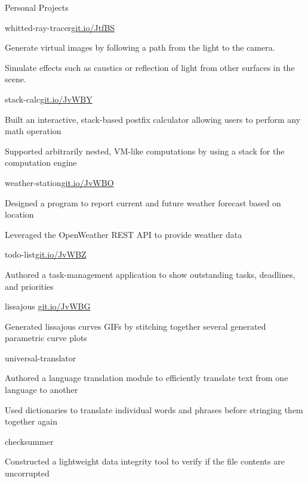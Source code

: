 \documentclass{resume} %
\begin{document}
\begin{rSection}{Personal Projects}
  \begin{rSubsection}{whitted-ray-tracer}{\href{https://git.io/JtfBS}{git.io/JtfBS}}{}{}
    \item Generate virtual images by following a path from the light to the camera.
    \item Simulate effects such as caustics or reflection of light from other surfaces in the scene.
  \end{rSubsection}

  \begin{rSubsection}{stack-calc}{\href{https://git.io/JvWBY}{git.io/JvWBY}}{}{}
    \item Built an interactive, stack-based postfix calculator allowing users
      to perform any math operation
    \item Supported arbitrarily nested, VM-like computations by using a stack
      for the computation engine
  \end{rSubsection}

  \begin{rSubsection}{weather-station}{\href{https://git.io/JvWBO}{git.io/JvWBO}}{}{}
    \item Designed a program to report current and future weather forecast
      based on location
    \item Leveraged the OpenWeather REST API to provide weather data
  \end{rSubsection}

  \begin{rSubsection} {todo-list}{\href{https://git.io/JvWBZ}{git.io/JvWBZ}}{}{}
    \item Authored a task-management application to show outstanding tasks,
      deadlines, and priorities
  \end{rSubsection}

  \begin{rSubsection}{lissajous} {\href{https://git.io/JvWBG}{git.io/JvWBG}}{}{}
    \item Generated lissajous curves GIFs by stitching together several generated
      parametric curve plots
  \end{rSubsection}

  \begin{rSubsection} {universal-translator} {} {} {}
    \item Authored a language translation module to efficiently translate
      text from one language to another
    \item Used dictionaries to translate individual words and phrases before
      stringing them together again
  \end{rSubsection}

  \begin{rSubsection} {checksummer} {} {} {}
    \item Constructed a lightweight data integrity tool to verify if the file
      contents are uncorrupted
  \end{rSubsection}

\end{rSection}
\end{document}
